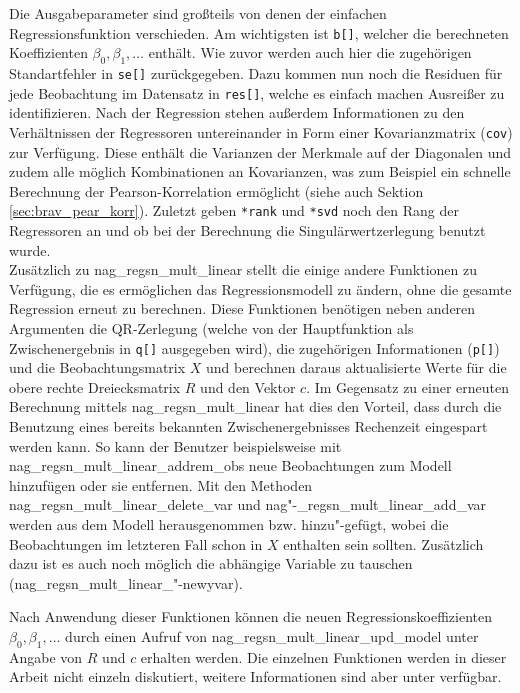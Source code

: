 Die Ausgabeparameter sind großteils von denen der einfachen Regressionsfunktion verschieden.
Am wichtigsten ist \lstinline{b[]}, welcher die berechneten Koeffizienten $\beta_0, \beta_1, \dots$ enthält.
Wie zuvor werden auch hier die zugehörigen Standartfehler in \lstinline{se[]} zurückgegeben.
Dazu kommen nun noch die Residuen für jede Beobachtung im Datensatz in \lstinline{res[]}, welche es einfach machen Ausreißer zu identifizieren.
Nach der Regression stehen außerdem Informationen zu den Verhältnissen der Regressoren untereinander in Form einer Kovarianzmatrix (\lstinline{cov}) zur Verfügung.
Diese enthält die Varianzen der Merkmale auf der Diagonalen und zudem alle möglich Kombinationen an Kovarianzen, was zum Beispiel ein schnelle Berechnung der Pearson-Korrelation ermöglicht (siehe auch Sektion \ref{sec:brav_pear_korr}).
Zuletzt geben \lstinline{*rank} und \lstinline{*svd} noch den Rang der Regressoren an und ob bei der Berechnung die Singulärwertzerlegung benutzt wurde.
\\

Zusätzlich zu nag\_regsn\_mult\_linear stellt die \naglib einige andere Funktionen zu Verfügung, die es ermöglichen das Regressionsmodell zu ändern, ohne die gesamte Regression erneut zu berechnen.
Diese Funktionen benötigen neben anderen Argumenten die QR-Zerlegung (welche von der Hauptfunktion als Zwischenergebnis in \lstinline{q[]} ausgegeben wird), die zugehörigen Informationen (\lstinline{p[]}) und die Beobachtungsmatrix $X$ und berechnen daraus aktualisierte Werte für die obere rechte Dreiecksmatrix $R$ und den Vektor $c$.
Im Gegensatz zu einer erneuten Berechnung mittels nag\_regsn\_mult\_linear hat dies den Vorteil, dass durch die Benutzung eines bereits bekannten Zwischenergebnisses Rechenzeit eingespart werden kann.
So kann der Benutzer beispielsweise mit nag\_regsn\_mult\_linear\_addrem\_obs neue Beobachtungen zum Modell hinzufügen oder sie entfernen.
Mit den Methoden nag\_regsn\_mult\_linear\_delete\_var und nag"-\_regsn\_mult\_linear\_add\_var werden aus dem Modell herausgenommen bzw. hinzu"-gefügt, wobei die Beobachtungen im letzteren Fall schon in $X$ enthalten sein sollten.
Zusätzlich dazu ist es auch noch möglich die abhängige Variable zu tauschen (nag\_regsn\_mult\_linear\_"-newyvar).

Nach Anwendung dieser Funktionen können die neuen Regressionskoeffizienten $\beta_0, \beta_1, \dots$ durch einen Aufruf von nag\_regsn\_mult\_linear\_upd\_model unter Angabe von $R$ und $c$ erhalten werden.
Die einzelnen Funktionen werden in dieser Arbeit nicht einzeln diskutiert, weitere Informationen sind aber unter \citep{nag:contents} verfügbar.






